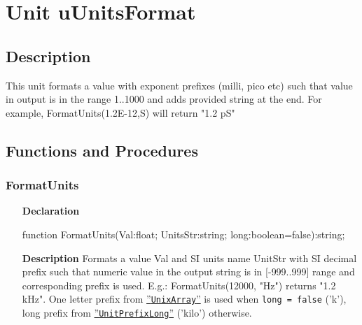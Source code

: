 \documentclass[12pt,a4paper,oneside]{report}
\newcommand{\lmath}[1]{   %
	\marginpar{\vspace{#1} 
		\begin{flushright}
			LMath
	\end{flushright} }
}
\newcommand{\declarationitem}[1]{\textbf{#1}}
\newcommand{\descriptiontitle}[1]{\textbf{#1}}
\newcommand{\code}[1]{\texttt{#1}}
\begin{document}
\section{Unit uUnitsFormat}\lmath{-24pt}
\label{lmunitsformat}
\subsection{Description}
This unit formats a value with exponent prefixes (milli, pico etc) such that value in output is in the range 1..1000 and adds provided string at the end. For example, FormatUnits(1.2E{-}12,S) will return "1.2 pS"
\subsection{Functions and Procedures}
\subsubsection{FormatUnits}
\label{lmunitsformat-FormatUnits}
\begin{itemize}\item[\declarationitem{Declaration}\hfill]
	\begin{flushleft}
		\begin{ttfamily}
			function FormatUnits(Val:float; UnitsStr:string; long:boolean=false):string;\end{ttfamily}
		
	\end{flushleft}
	
	\par
	\item[\descriptiontitle{Description}]
	Formats a value Val and SI units name UnitStr with SI decimal prefix such that numeric value in the output string is in [{-}999..999] range and corresponding prefix is used. E.g.: FormatUnits(12000, "Hz") returns "1.2 kHz". One letter prefix from \hyperref[lmunitsformat-UnitPrefix]{''\code{UnixArray}''} is used when \code{long = false} ('k'), long prefix from \hyperref[lmunitsformat-UnitPrefixLong]{''\code{UnitPrefixLong}''} ('kilo') otherwise.
	
\end{itemize}
\end{document}
